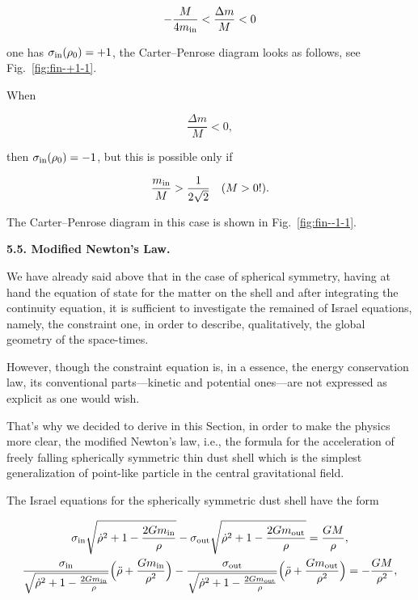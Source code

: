 $$

 - \frac{M}{4 m_{\rm in}} < \frac{\Delta m}{M }< 0

$$ 

one has $\sigma_{\rm in}(\rho_0) = + 1$, the Carter--Penrose diagram looks as follows, see Fig.~\ref{fig:fin-+1-1}.





When 

$$

\frac{\Delta m}{M} < 0,

$$ 

then $\sigma _{\rm in}(\rho_0) = - 1$, but this is possible only if 

$$

\frac{m_{\rm in}}{M} > \frac{1}{2 \sqrt{2}}\quad  (M > 0!).

$$ 

The Carter--Penrose diagram in this case  is shown in Fig.~\ref{fig:fin--1-1}.





\smallskip



\textbf{5.5. Modified Newton's Law.}

We have already said above that in the case of spherical symmetry, having at hand the equation of state for the matter on the shell and after integrating the continuity equation, it is sufficient to investigate the remained of Israel equations, namely, the constraint one, in order to describe, qualitatively, the global geometry of the space-times. 

However, though the con\-straint equation is, in a essence, the energy conservation law, its conventional parts---kinetic and potential ones---are not expressed as explicit as one would wish. 

That's why we decided to derive in this Section, in order to make the physics more clear, the modified Newton's law, i.e., the formula for the acceleration of freely falling spherically symmetric thin dust shell which is the simplest generalization of point-like particle in the central gravitational field.



The Israel equations for the spherically symmetric dust shell have the form

\begin{gather}

\label{dustsh}

\sigma_{\rm in} \sqrt{\dot \rho^2 + 1 - \frac{2 G m_{\rm in}}{\rho}} - \sigma_{\rm out} \sqrt{\dot \rho^2 + 1 - \frac{2 G m_{\rm out}}{\rho}} = \frac{G M}{\rho} ,\\

\frac{\sigma_{\rm in}}{ \sqrt{\dot \rho^2 + 1 - \frac{2 G m_{\rm in}}{\rho}}} \Bigl( \ddot \rho + \frac{G m_{\rm in}}{\rho^2} \Bigr) - \frac{\sigma_{\rm out}}{ \sqrt{\dot \rho^2 + 1 - \frac{2 G m_{\rm out}}{\rho}}} \Bigl( \ddot \rho + \frac{G m_{\rm out}}{\rho^2} \Bigr) = - \frac{G M}{\rho^2} ,\\

\end{gather}


